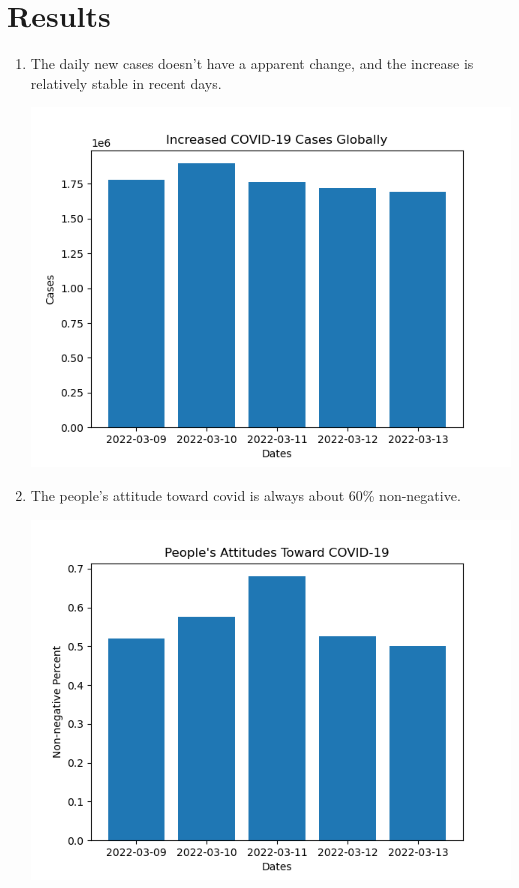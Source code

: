 \documentclass[a4paper, 12pt]{article}
\begin{document}
\section*{Results}
\begin{enumerate}
    \item The daily new cases doesn't have a apparent change, and the increase is relatively stable in recent days.
    \begin{center}
        \includegraphics[scale=0.6]{cases.png}
    \end{center}
    \item The people's attitude toward covid is always about 60\% non-negative.
    \begin{center}
        \includegraphics[scale=0.6]{attitudes.png}

\end{center}
\end{enumerate}
\end{document}
